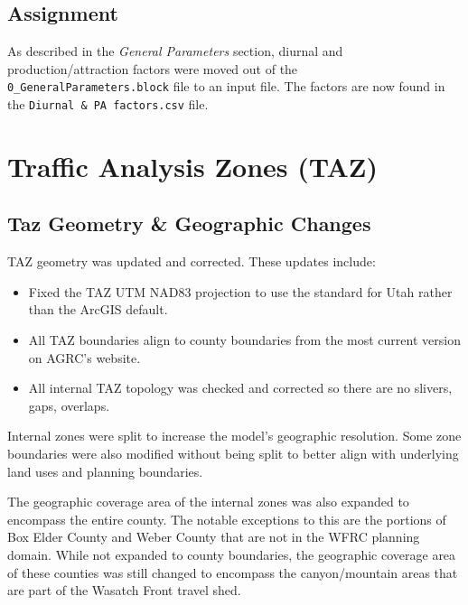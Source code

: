 \documentclass[
  letterpaper,
  DIV=11,
  numbers=noendperiod,
  titlepage=false]{scrreprt}
\providecommand{\tightlist}{%
  \setlength{\itemsep}{0pt}\setlength{\parskip}{0pt}}\usepackage{longtable,booktabs,array}
\begin{document}
\newpage

\hypertarget{assignment}{%
\subsection{Assignment}\label{assignment}}

As described in the \emph{General Parameters} section, diurnal and
production/attraction factors were moved out of the
\texttt{0\_GeneralParameters.block} file to an input file. The factors
are now found in the \texttt{Diurnal\ \&\ PA\ factors.csv} file.

\hypertarget{traffic-analysis-zones-taz}{%
\section{Traffic Analysis Zones
(TAZ)}\label{traffic-analysis-zones-taz}}

\hypertarget{taz-geometry-geographic-changes}{%
\subsection{Taz Geometry \& Geographic
Changes}\label{taz-geometry-geographic-changes}}

TAZ geometry was updated and corrected. These updates include:

\begin{itemize}
\tightlist
\item
  Fixed the TAZ UTM NAD83 projection to use the standard for Utah rather
  than the ArcGIS default.
\item
  All TAZ boundaries align to county boundaries from the most current
  version on AGRC's website.
\item
  All internal TAZ topology was checked and corrected so there are no
  slivers, gaps, overlaps.
\end{itemize}

Internal zones were split to increase the model's geographic resolution.
Some zone boundaries were also modified without being split to better
align with underlying land uses and planning boundaries.

The geographic coverage area of the internal zones was also expanded to
encompass the entire county. The notable exceptions to this are the
portions of Box Elder County and Weber County that are not in the WFRC
planning domain. While not expanded to county boundaries, the geographic
coverage area of these counties was still changed to encompass the
canyon/mountain areas that are part of the Wasatch Front travel shed.
\end{document}
